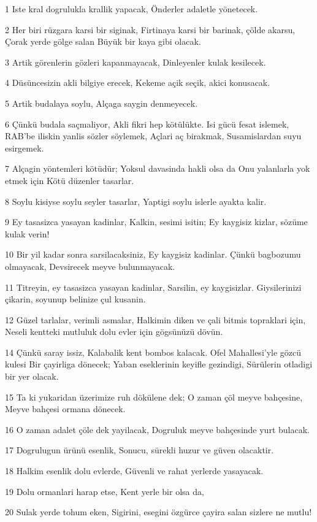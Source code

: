 \par 1 Iste kral dogrulukla krallik yapacak, Önderler adaletle yönetecek.
\par 2 Her biri rüzgara karsi bir siginak, Firtinaya karsi bir barinak, çölde akarsu, Çorak yerde gölge salan Büyük bir kaya gibi olacak.
\par 3 Artik görenlerin gözleri kapanmayacak, Dinleyenler kulak kesilecek.
\par 4 Düsüncesizin akli bilgiye erecek, Kekeme açik seçik, akici konusacak.
\par 5 Artik budalaya soylu, Alçaga saygin denmeyecek.
\par 6 Çünkü budala saçmaliyor, Akli fikri hep kötülükte. Isi gücü fesat islemek, RAB'be iliskin yanlis sözler söylemek, Açlari aç birakmak, Susamislardan suyu esirgemek.
\par 7 Alçagin yöntemleri kötüdür; Yoksul davasinda hakli olsa da Onu yalanlarla yok etmek için Kötü düzenler tasarlar.
\par 8 Soylu kisiyse soylu seyler tasarlar, Yaptigi soylu islerle ayakta kalir.
\par 9 Ey tasasizca yasayan kadinlar, Kalkin, sesimi isitin; Ey kaygisiz kizlar, sözüme kulak verin!
\par 10 Bir yil kadar sonra sarsilacaksiniz, Ey kaygisiz kadinlar. Çünkü bagbozumu olmayacak, Devsirecek meyve bulunmayacak.
\par 11 Titreyin, ey tasasizca yasayan kadinlar, Sarsilin, ey kaygisizlar. Giysilerinizi çikarin, soyunup belinize çul kusanin.
\par 12 Güzel tarlalar, verimli asmalar, Halkimin diken ve çali bitmis topraklari için, Neseli kentteki mutluluk dolu evler için gögsünüzü dövün.
\par 14 Çünkü saray issiz, Kalabalik kent bombos kalacak. Ofel Mahallesi'yle gözcü kulesi Bir çayirliga dönecek; Yaban eseklerinin keyifle gezindigi, Sürülerin otladigi bir yer olacak.
\par 15 Ta ki yukaridan üzerimize ruh dökülene dek; O zaman çöl meyve bahçesine, Meyve bahçesi ormana dönecek.
\par 16 O zaman adalet çöle dek yayilacak, Dogruluk meyve bahçesinde yurt bulacak.
\par 17 Dogrulugun ürünü esenlik, Sonucu, sürekli huzur ve güven olacaktir.
\par 18 Halkim esenlik dolu evlerde, Güvenli ve rahat yerlerde yasayacak.
\par 19 Dolu ormanlari harap etse, Kent yerle bir olsa da,
\par 20 Sulak yerde tohum eken, Sigirini, esegini özgürce çayira salan sizlere ne mutlu!

